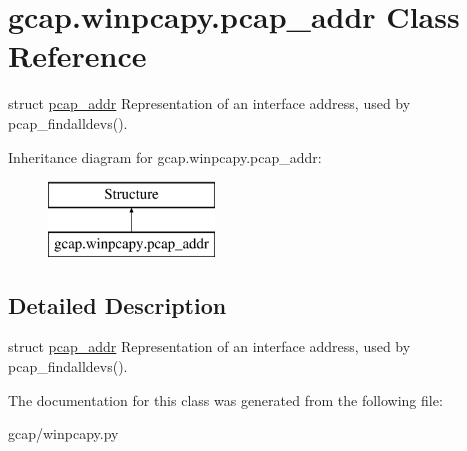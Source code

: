 \hypertarget{classgcap_1_1winpcapy_1_1pcap__addr}{}\section{gcap.\+winpcapy.\+pcap\+\_\+addr Class Reference}
\label{classgcap_1_1winpcapy_1_1pcap__addr}


struct \hyperlink{classgcap_1_1winpcapy_1_1pcap__addr}{pcap\+\_\+addr} Representation of an interface address, used by pcap\+\_\+findalldevs().  


Inheritance diagram for gcap.\+winpcapy.\+pcap\+\_\+addr\+:\begin{figure}[H]
\begin{center}
\leavevmode
\includegraphics[height=2.000000cm]{df/daa/classgcap_1_1winpcapy_1_1pcap__addr}
\end{center}
\end{figure}


\subsection{Detailed Description}
struct \hyperlink{classgcap_1_1winpcapy_1_1pcap__addr}{pcap\+\_\+addr} Representation of an interface address, used by pcap\+\_\+findalldevs(). 



The documentation for this class was generated from the following file\+:\begin{DoxyCompactItemize}
\item 
gcap/winpcapy.\+py\end{DoxyCompactItemize}

